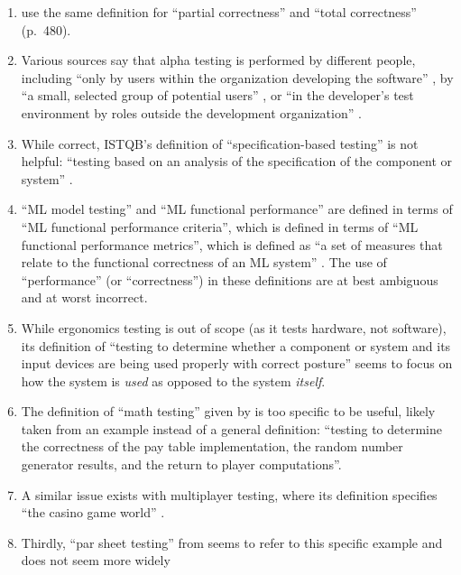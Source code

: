 \begin{enumerate}
      \item \citeauthor{IEEE2017} use the same definition for ``partial correctness''
            \citeyearpar[p.~314]{IEEE2017} and ``total correctness'' (p.~480).
      \item Various sources say that alpha testing is performed by different
            people, including ``only by users within the organization
            developing the software'' \citep[p.~17]{IEEE2017}, by ``a small,
            selected group of potential users'' \citep[p.~5-8]{SWEBOK2024}, or
            ``in the developer's test environment by roles outside the
            development organization'' \citepISTQB{}.
      \item While correct, ISTQB's definition of ``specification-based testing''
            is not helpful: ``testing based on an analysis of the specification
            of the component or system'' \citepISTQB{}.
      \item ``ML model testing'' and ``ML functional performance'' are defined
            in terms of ``ML functional performance criteria'', which is defined
            in terms of ``ML functional performance metrics'', which is defined
            as ``a set of measures that relate to the functional correctness of
            an ML system'' \citepISTQB{}. The use of ``performance'' (or
            ``correctness'') in these definitions are at best ambiguous and at
            worst incorrect.
      \item While ergonomics testing is out of scope (as it tests hardware, not
            software), its definition of ``testing to determine whether a
            component or system and its input devices are being used properly
            with correct posture'' \citepISTQB{} seems to focus on how the
            system is \emph{used} as opposed to the system \emph{itself}.
      \item The definition of ``math testing'' given by \citetISTQB{} is
            too specific to be useful, likely taken from an example instead of
            a general definition: ``testing to determine the correctness of the
            pay table implementation, the random number generator results, and
            the return to player computations''.
      \item A similar issue exists with multiplayer testing, where its
            definition specifies ``the casino game world'' \citepISTQB{}.
      \item Thirdly, ``par sheet testing'' from \citepISTQB{} seems to
            refer to this specific example and does not seem more widely

\end{enumerate}
